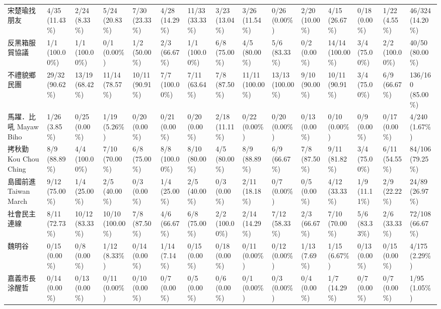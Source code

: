 \documentclass[a4paper, 10pt, conference]{ieeeconf}       %
\begin{document}
\begin{CJK}{UTF8}{bsmi}
\begin{landscape}
\begin{longtable}[c]{@{}L{2.45cm}L{1.1cm}L{1.1cm}L{1.1cm}L{1.1cm}L{1.1cm}L{1.1cm}L{1.1cm}L{1.1cm}L{1.1cm}L{1.1cm}L{1.1cm}L{1.1cm}L{1.1cm}L{1.1cm}@{}}
宋楚瑜找朋友 & 4/35 (11.43\%) & 2/24 (8.33\%) & 5/24 (20.83\%) & 7/30 (23.33\%) & 4/28 (14.29\%) & 11/33 (33.33\%) & 3/23 (13.04\%) & 3/26 (11.54\%) & 0/26 (0.00\%) & 2/20 (10.00\%) & 4/15 (26.67\%) & 0/18 (0.00\%) & 1/22 (4.55\%) & 46/324 (14.20\%) \\
反黑箱服貿協議 & 1/1 (100.00\%) & 1/1 (100.00\%) & 0/1 (0.00\%) & 1/2 (50.00\%) & 2/3 (66.67\%) & 1/1 (100.00\%) & 6/8 (75.00\%) & 4/5 (80.00\%) & 5/6 (83.33\%) & 0/2 (0.00\%) & 14/14 (100.00\%) & 3/4 (75.00\%) & 2/2 (100.00\%) & 40/50 (80.00\%) \\
不禮貌鄉民團 & 29/32 (90.62\%) & 13/19 (68.42\%) & 11/14 (78.57\%) & 10/11 (90.91\%) & 7/7 (100.00\%) & 7/11 (63.64\%) & 7/8 (87.50\%) & 11/11 (100.00\%) & 13/13 (100.00\%) & 9/10 (90.00\%) & 10/11 (90.91\%) & 3/4 (75.00\%) & 6/9 (66.67\%) & 136/160 (85.00\%) \\
馬躍．比吼 Mayaw Biho & 1/26 (3.85\%) & 0/25 (0.00\%) & 1/19 (5.26\%) & 0/20 (0.00\%) & 0/21 (0.00\%) & 0/20 (0.00\%) & 2/18 (11.11\%) & 0/22 (0.00\%) & 0/20 (0.00\%) & 0/13 (0.00\%) & 0/10 (0.00\%) & 0/9 (0.00\%) & 0/17 (0.00\%) & 4/240 (1.67\%) \\
拷秋勤 Kou Chou Ching & 8/9 (88.89\%) & 4/4 (100.00\%) & 7/10 (70.00\%) & 6/8 (75.00\%) & 8/8 (100.00\%) & 8/10 (80.00\%) & 4/5 (80.00\%) & 8/9 (88.89\%) & 6/9 (66.67\%) & 7/8 (87.50\%) & 9/11 (81.82\%) & 3/4 (75.00\%) & 6/11 (54.55\%) & 84/106 (79.25\%) \\
島國前進 Taiwan March & 9/12 (75.00\%) & 1/4 (25.00\%) & 2/5 (40.00\%) & 0/3 (0.00\%) & 1/4 (25.00\%) & 2/5 (40.00\%) & 0/3 (0.00\%) & 2/11 (18.18\%) & 0/7 (0.00\%) & 0/5 (0.00\%) & 4/12 (33.33\%) & 1/9 (11.11\%) & 2/9 (22.22\%) & 24/89 (26.97\%) \\
社會民主連線 & 8/11 (72.73\%) & 10/12 (83.33\%) & 10/10 (100.00\%) & 7/8 (87.50\%) & 4/6 (66.67\%) & 6/8 (75.00\%) & 2/2 (100.00\%) & 2/14 (14.29\%) & 7/12 (58.33\%) & 2/3 (66.67\%) & 7/10 (70.00\%) & 5/6 (83.33\%) & 2/6 (33.33\%) & 72/108 (66.67\%) \\
魏明谷 & 0/15 (0.00\%) & 0/8 (0.00\%) & 1/12 (8.33\%) & 0/14 (0.00\%) & 1/14 (7.14\%) & 0/15 (0.00\%) & 0/18 (0.00\%) & 0/11 (0.00\%) & 0/12 (0.00\%) & 1/13 (7.69\%) & 1/15 (6.67\%) & 0/13 (0.00\%) & 0/15 (0.00\%) & 4/175 (2.29\%) \\
嘉義市長涂醒哲 & 0/14 (0.00\%) & 0/13 (0.00\%) & 0/11 (0.00\%) & 0/10 (0.00\%) & 0/7 (0.00\%) & 0/5 (0.00\%) & 0/6 (0.00\%) & 0/1 (0.00\%) & 0/3 (0.00\%) & 0/4 (0.00\%) & 1/7 (14.29\%) & 0/7 (0.00\%) & 0/7 (0.00\%) & 1/95 (1.05\%) \\

\end{longtable}
\end{landscape}
\end{CJK}
\end{document}
